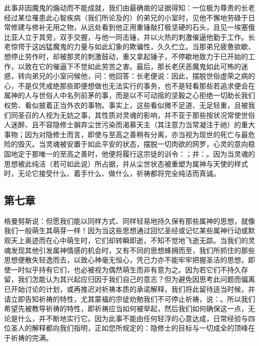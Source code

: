此事非因魔鬼的煽动而不能成就，我们由最确凿的证据得知：一位极为尊贵的长老经过某位罹患此心智疾病（我们所论及的）的弟兄的小室时，见他不懈地劳碌于日常修建与修补无用之物，从远处看到他正用重锤敲打极坚硬的石头，且见一埃塞俄比亚人立于其旁，双手交握，与他一同击锤，并以火热的刺激催逼他勤于工作。长老惊愕于这凶猛魔鬼的力量与如此幻象的欺骗性，久久伫立。当那弟兄疲惫欲歇、想停止劳作时，却被那灵的刺激鼓动，重又拿起锤子，不停歇地致力于已开始的工作，以致在它的催逼下不觉如此劳苦之害。最后，那长老厌恶魔鬼如此可怖的迷惑，转向弟兄的小室问候他，问：他回答：长老便说：因此，摆脱世俗虚荣之病的心，不是仅凭戒绝那些即便想做也无法实行的事务，也不是轻看那些若追求便会在属神的人与世俗人中名列前茅的事，而是以不可动摇的坚毅之心拒绝一切助长我们权势、看似披着正当外衣的事物。事实上，这些看似微不足道、无足轻重，且被我们同圣召的人视为无妨之事，其性质对灵魂的影响，并不亚于那些按状况常使世俗人迷醉、且不容隐修士摒弃尘世污染而渴慕天主（其注意力当常凝注于祂）的重大事物；因为对隐修士而言，即使与至高之善稍有分离，亦当视为现世的死亡与最危险的毁灭。当灵魂被安置于如此平安的状态，摆脱一切肉欲的网罗，心灵的意向稳固地定于那唯一的至高之善时，他便将履行这宗徒的训令：；并：。因为当灵魂的思想被此纯洁（若可如此说）所占据，并从尘世状态被重塑为属神与天使的样式时，无论它接受什么、着手什么、做什么，祈祷都将完全纯洁而真诚。\par


\subsection{第七章}

\par

格曼努斯说：但愿我们能以同样方式、同样轻易地持久保有那些属神的思想，就像我们一般萌生其萌芽一样！因为当这些思想通过回忆圣经或记忆某些属神行动或默观天上奥迹而在心中萌生时，它们却转瞬即逝，不知不觉地飞逝无踪。当我们的灵魂发现其他引发属神情感的机会时，又有不同的思想蜂拥而至，我们所抓住的那些思想便散失轻逸而去，以致心神毫无恒心，凭己力亦不能牢牢把握圣洁的思想，即使一时似乎持有它们，也必被视为偶然萌生而非有意为之。因为若它们不持久存留，我们怎能认为其兴起应归因于我们自己的意志？但为避免因思考此问题而偏离已开始讨论的计划，或再推迟对祈祷本质的承诺解释，我们将此留待适当时候，并请立即告知祈祷的特性，尤其蒙福的宗徒劝勉我们不可停止祈祷，说：。所以我们希望先被教导祈祷的特性，即祈祷应当如何被举起，然后我们如何确保这一点，无论是什么，并不断地实行它。因为此事不能由任何轻浮的心意达成，日常经验与四位圣人的解释都向我们指明，正如您所规定的：隐修士的目标与一切成全的顶峰在于祈祷的完满。\par

